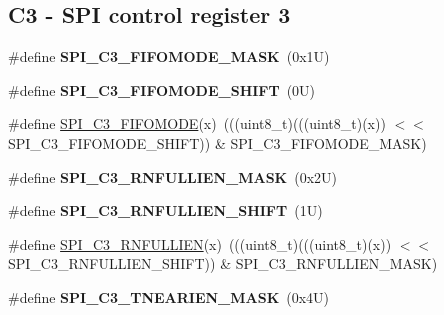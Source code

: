 \subsection*{C3 -\/ S\+PI control register 3}
\begin{DoxyCompactItemize}
\item 
\mbox{\label{group___s_p_i___register___masks_ga0bb5cd89df35f2cac9889810489cef76}} 
\#define {\bfseries S\+P\+I\+\_\+\+C3\+\_\+\+F\+I\+F\+O\+M\+O\+D\+E\+\_\+\+M\+A\+SK}~(0x1\+U)
\item 
\mbox{\label{group___s_p_i___register___masks_ga58cdf97144959affeaee5aa181cf11e0}} 
\#define {\bfseries S\+P\+I\+\_\+\+C3\+\_\+\+F\+I\+F\+O\+M\+O\+D\+E\+\_\+\+S\+H\+I\+FT}~(0\+U)
\item 
\#define \mbox{\hyperlink{group___s_p_i___register___masks_ga784fe299d8f886ce7d6770ca96fdec85}{S\+P\+I\+\_\+\+C3\+\_\+\+F\+I\+F\+O\+M\+O\+DE}}(x)~(((uint8\+\_\+t)(((uint8\+\_\+t)(x)) $<$$<$ S\+P\+I\+\_\+\+C3\+\_\+\+F\+I\+F\+O\+M\+O\+D\+E\+\_\+\+S\+H\+I\+FT)) \& S\+P\+I\+\_\+\+C3\+\_\+\+F\+I\+F\+O\+M\+O\+D\+E\+\_\+\+M\+A\+SK)
\item 
\mbox{\label{group___s_p_i___register___masks_gaec79f2cbf81e417c52e1494a3317a17a}} 
\#define {\bfseries S\+P\+I\+\_\+\+C3\+\_\+\+R\+N\+F\+U\+L\+L\+I\+E\+N\+\_\+\+M\+A\+SK}~(0x2\+U)
\item 
\mbox{\label{group___s_p_i___register___masks_ga0045386d116b230ce58ad47e1e8b51ba}} 
\#define {\bfseries S\+P\+I\+\_\+\+C3\+\_\+\+R\+N\+F\+U\+L\+L\+I\+E\+N\+\_\+\+S\+H\+I\+FT}~(1\+U)
\item 
\#define \mbox{\hyperlink{group___s_p_i___register___masks_ga05078f4e2f2d3a256a18ab937fb13a55}{S\+P\+I\+\_\+\+C3\+\_\+\+R\+N\+F\+U\+L\+L\+I\+EN}}(x)~(((uint8\+\_\+t)(((uint8\+\_\+t)(x)) $<$$<$ S\+P\+I\+\_\+\+C3\+\_\+\+R\+N\+F\+U\+L\+L\+I\+E\+N\+\_\+\+S\+H\+I\+FT)) \& S\+P\+I\+\_\+\+C3\+\_\+\+R\+N\+F\+U\+L\+L\+I\+E\+N\+\_\+\+M\+A\+SK)
\item 
\mbox{\label{group___s_p_i___register___masks_gae2d0e88383efb0514af6469bac2b9fad}} 
\#define {\bfseries S\+P\+I\+\_\+\+C3\+\_\+\+T\+N\+E\+A\+R\+I\+E\+N\+\_\+\+M\+A\+SK}~(0x4\+U)
\item 

\end{DoxyCompactItemize}
